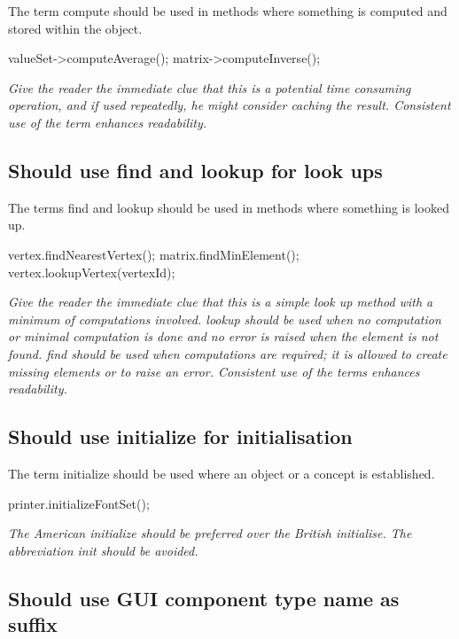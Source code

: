 \documentclass[a4paper,11pt,oneside]{scrbook}
\newcommand{\guideline}[1]{{\subsection{#1}}}
\newcommand{\motivation}[1]{{\normalfont \itshape #1}}
\newcommand{\trcode}[1]{{\normalfont \ttfamily #1}}
\begin{document}
The term \trcode{compute} should be used in methods where something is computed
and stored within the object.

\begin{code}
  valueSet->computeAverage();
  matrix->computeInverse(); 
\end{code}

\motivation{ 
  Give the reader the immediate clue that this is a potential time consuming
  operation, and if used repeatedly, he might consider caching the
  result. Consistent use of the term enhances readability.
}

\guideline{Should use \trcode{find} and \trcode{lookup} for look ups}

The terms \trcode{find} and \trcode{lookup} should be used in methods where
something is looked up.

\begin{code}
  vertex.findNearestVertex();
  matrix.findMinElement();
  vertex.lookupVertex(vertexId);
\end{code}

\motivation{
  Give the reader the immediate clue that this is a simple look up method with a
  minimum of computations involved. \trcode{lookup} should be used when no
  computation or minimal computation is done and no error is raised when the
  element is not found. \trcode{find} should be used when computations are
  required; it is allowed to create missing elements or to raise an
  error. Consistent use of the terms enhances readability.
}

\guideline{Should use \trcode{initialize} for initialisation}

The term \trcode{initialize} should be used where an object or a concept is
established.

\begin{code}
  printer.initializeFontSet(); 
\end{code}

\motivation{
  The American initialize should be preferred over the British initialise.  The
  abbreviation \trcode{init} should be avoided.
}

\guideline{Should use GUI component type name as suffix}
\end{document}
